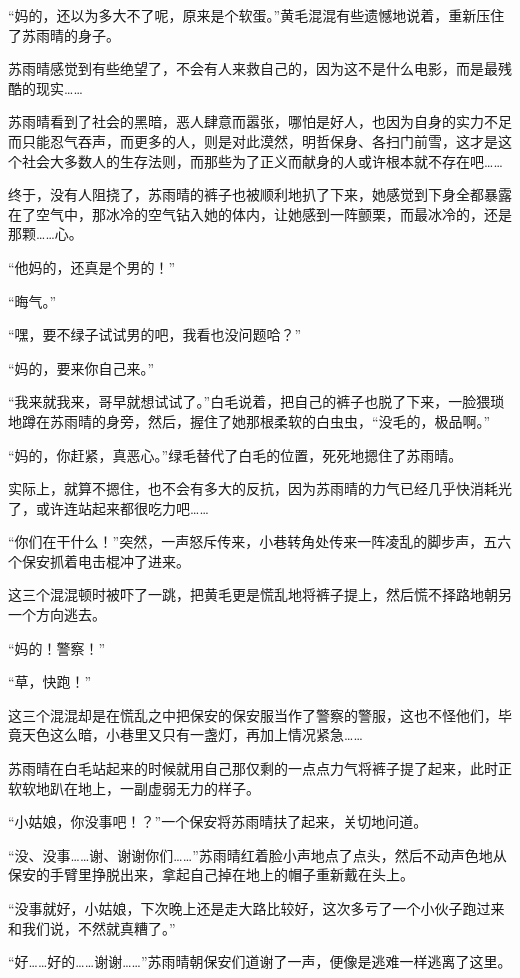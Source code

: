 “妈的，还以为多大不了呢，原来是个软蛋。”黄毛混混有些遗憾地说着，重新压住了苏雨晴的身子。

苏雨晴感觉到有些绝望了，不会有人来救自己的，因为这不是什么电影，而是最残酷的现实……

苏雨晴看到了社会的黑暗，恶人肆意而嚣张，哪怕是好人，也因为自身的实力不足而只能忍气吞声，而更多的人，则是对此漠然，明哲保身、各扫门前雪，这才是这个社会大多数人的生存法则，而那些为了正义而献身的人或许根本就不存在吧……

终于，没有人阻挠了，苏雨晴的裤子也被顺利地扒了下来，她感觉到下身全都暴露在了空气中，那冰冷的空气钻入她的体内，让她感到一阵颤栗，而最冰冷的，还是那颗……心。

“他妈的，还真是个男的！”

“晦气。”

“嘿，要不绿子试试男的吧，我看也没问题哈？”

“妈的，要来你自己来。”

“我来就我来，哥早就想试试了。”白毛说着，把自己的裤子也脱了下来，一脸猥琐地蹲在苏雨晴的身旁，然后，握住了她那根柔软的白虫虫，“没毛的，极品啊。”

“妈的，你赶紧，真恶心。”绿毛替代了白毛的位置，死死地摁住了苏雨晴。

实际上，就算不摁住，也不会有多大的反抗，因为苏雨晴的力气已经几乎快消耗光了，或许连站起来都很吃力吧……

“你们在干什么！”突然，一声怒斥传来，小巷转角处传来一阵凌乱的脚步声，五六个保安抓着电击棍冲了进来。

这三个混混顿时被吓了一跳，把黄毛更是慌乱地将裤子提上，然后慌不择路地朝另一个方向逃去。

“妈的！警察！”

“草，快跑！”

这三个混混却是在慌乱之中把保安的保安服当作了警察的警服，这也不怪他们，毕竟天色这么暗，小巷里又只有一盏灯，再加上情况紧急……

苏雨晴在白毛站起来的时候就用自己那仅剩的一点点力气将裤子提了起来，此时正软软地趴在地上，一副虚弱无力的样子。

“小姑娘，你没事吧！？”一个保安将苏雨晴扶了起来，关切地问道。

“没、没事……谢、谢谢你们……”苏雨晴红着脸小声地点了点头，然后不动声色地从保安的手臂里挣脱出来，拿起自己掉在地上的帽子重新戴在头上。

“没事就好，小姑娘，下次晚上还是走大路比较好，这次多亏了一个小伙子跑过来和我们说，不然就真糟了。”

“好……好的……谢谢……”苏雨晴朝保安们道谢了一声，便像是逃难一样逃离了这里。

